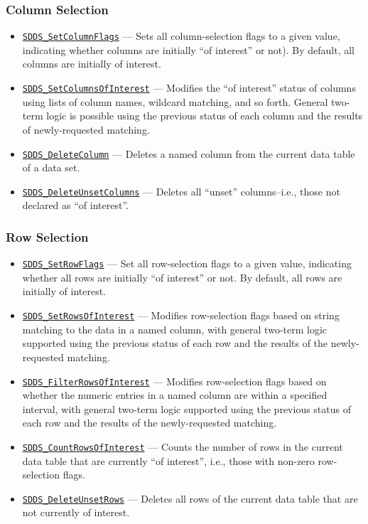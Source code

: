 \documentclass[11pt]{article}
\newcommand{\progref}[1]{\hyperref[SDDS_#1]{\tt SDDS\_#1}}
\begin{document}
\subsubsection{Column Selection}

\begin{itemize}
\item \progref{SetColumnFlags} --- Sets all column-selection flags to a given value, indicating whether columns are initially ``of interest'' or not). By default, all columns are initially of interest.
\item \progref{SetColumnsOfInterest} --- Modifies the ``of interest'' status of columns using lists of column names, wildcard matching, and so forth. General two-term logic is possible using the previous status of each column and the results of newly-requested matching.
\item \progref{DeleteColumn} --- Deletes a named column from the current data table of a data set.
\item \progref{DeleteUnsetColumns} --- Deletes all ``unset'' columns--i.e., those not declared as ``of interest''. 
\end{itemize}

\subsubsection{Row Selection}

\begin{itemize}
\item \progref{SetRowFlags} --- Set all row-selection flags to a given value, indicating whether all rows are initially ``of interest'' or not. By default, all rows are initially of interest.
\item \progref{SetRowsOfInterest} --- Modifies row-selection flags based on string matching to the data in a named column, with general two-term logic supported using the previous status of each row and the results of the newly-requested matching.
\item \progref{FilterRowsOfInterest} --- Modifies row-selection flags based on whether the numeric entries in a named column are within a specified interval, with general two-term logic supported using the previous status of each row and the results of the newly-requested matching.
\item \progref{CountRowsOfInterest} --- Counts the number of rows in the current data table that are currently ``of interest'', i.e., those with non-zero row-selection flags.
\item \progref{DeleteUnsetRows} --- Deletes all rows of the current data table that are not currently of interest. 
\end{itemize}
\end{document}
